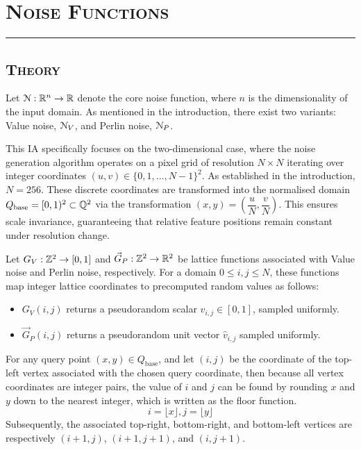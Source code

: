 \section{\textsc{Noise Functions}}
\hrule height 0.5pt
\vspace*{2.5pt}

\subsection{\textsc{Theory}}
\vspace*{-10pt}

Let $\EuScript{N}:\mathbb{R}^n\rightarrow\mathbb{R}$ denote the core noise function, where $n$ is the dimensionality of the
input domain. As mentioned in the introduction, there exist two variants: 
Value noise, $\EuScript{N}_V$, and Perlin noise, $\EuScript{N}_P$.

This IA specifically focuses on the two-dimensional case, where the noise generation algorithm operates on
a pixel grid of resolution $N\times N$ iterating over integer coordinates $(u,v)\in\{0,1,\dots,N-1\}^2$. As
established in the introduction, $N=256$. These discrete coordinates are transformed into the normalised domain 
$Q_\text{base}=[0,1)^2\subset\mathbb{Q}^2$ via the transformation $(x,y)=\left(\dfrac{u}{N},\dfrac{v}{N}\right)$. This 
ensures scale invariance, guaranteeing that relative feature positions remain constant under resolution change. 

Let $G_V:\mathbb{Z}^2\rightarrow[0,1]$ and $\vec{G}_P:\mathbb{Z}^2\rightarrow \mathbb{R}^2$ be lattice functions associated with Value noise and 
Perlin noise, respectively. For a domain $0\le i,j\le N$, these functions map integer lattice coordinates to precomputed
random values as follows:
\begin{itemize}
    \item $G_V(i,j)$ returns a pseudorandom scalar $v_{i,j}\in[0,1]$, sampled uniformly.
    \item $\vec{G}_P(i,j)$ returns a pseudorandom unit vector $\hat{v}_{i,j}$ sampled uniformly. 
\end{itemize}
For any query point $(x,y)\in Q_\text{base}$, and let $(i,j)$ be the coordinate of the top-left vertex associated with the
chosen query coordinate, then because all vertex coordinates are integer pairs, the value of $i$ and $j$ can be found by rounding
$x$ and $y$ down to the nearest integer, which is written as the floor function.
\[i=\lfloor x\rfloor,j=\lfloor y\rfloor\] 
Subsequently, the associated top-right, bottom-right, and bottom-left vertices are respectively $(i+1,j)$, $(i+1,j+1)$, and $(i,j+1)$.

